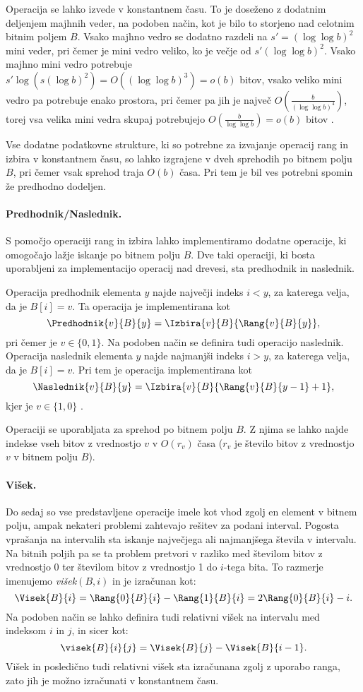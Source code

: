 Operacija se lahko izvede v konstantnem času. To je doseženo z dodatnim deljenjem majhnih veder, na podoben način, kot je bilo to storjeno nad celotnim bitnim poljem $B$. Vsako majhno vedro se dodatno razdeli na $s'=(\log\log b)^2$ mini veder, pri čemer je mini vedro veliko, ko je večje od $s'(\log\log b)^2$. Vsako majhno mini vedro potrebuje $s'\log{(s(\log{b})^2)}=O((\log\log b)^3)=o(b)$ bitov, vsako veliko mini vedro pa potrebuje enako prostora, pri čemer pa jih je največ $O\left(\frac{b}{(\log\log b)^4}\right)$, torej vsa velika mini vedra skupaj potrebujejo $O\left(\frac{b}{\log\log b}\right) =o(b)$ bitov \cite{Navarro2016}.


Vse dodatne podatkovne strukture, ki so potrebne za izvajanje operacij rang in izbira v konstantnem času, so lahko izgrajene v dveh sprehodih po bitnem polju $B$, pri čemer vsak sprehod traja $O(b)$ časa. Pri tem je bil ves potrebni spomin že predhodno dodeljen.

\paragraph{Predhodnik/Naslednik.}
S pomočjo operaciji rang in izbira lahko implementiramo dodatne operacije, ki omogočajo lažje iskanje po bitnem polju $B$. Dve taki operaciji, ki bosta uporabljeni za implementacijo operacij nad drevesi, sta predhodnik in naslednik.

Operacija predhodnik elementa $y$ najde največji indeks $i<y$, za katerega velja, da je $B[i]=v$. Ta operacija je implementirana kot
    $$\Predhodnik{v}{B}{y}=\Izbira{v}{B}{\Rang{v}{B}{y}},$$
pri čemer je $v\in \{0,1\}$. Na podoben način se definira tudi operacijo naslednik. Operacija naslednik elementa $y$ najde najmanjši indeks $i>y$, za katerega velja, da je $B[i]=v$. Pri tem je operacija implementirana kot
    $$\Naslednik{v}{B}{y}=\Izbira{v}{B}{\Rang{v}{B}{y-1}+1},$$
kjer je $v\in \{1,0\}$ \cite{Navarro2016}.

Operaciji se uporabljata za sprehod po bitnem polju $B$. Z njima se lahko najde indekse vseh bitov z vrednostjo $v$ v $O(r_v)$ časa ($r_v$ je število bitov z vrednostjo $v$ v bitnem polju $B$).

\paragraph{Višek.}
Do sedaj so vse predstavljene operacije imele kot vhod zgolj en element v bitnem polju, ampak nekateri problemi zahtevajo rešitev za podani interval. Pogosta vprašanja na intervalih sta iskanje največjega ali najmanjšega števila v intervalu. Na bitnih poljih pa se ta problem pretvori v razliko med številom bitov z vrednostjo 0 ter številom bitov z vrednostjo 1 do $i$-tega bita. To razmerje imenujemo \textit{višek}$(B,i)$ in je izračunan kot:
$$
    \Visek{B}{i}=\Rang{0}{B}{i}-\Rang{1}{B}{i}=2\Rang{0}{B}{i}-i.
$$
Na podoben način se lahko definira tudi relativni višek na intervalu med indeksom $i$ in $j$, in sicer kot:
$$
    \visek{B}{i}{j}=\Visek{B}{j}-\Visek{B}{i-1}.
$$
Višek in posledično tudi relativni višek sta izračunana zgolj z uporabo ranga, zato jih je možno izračunati v konstantnem času.

